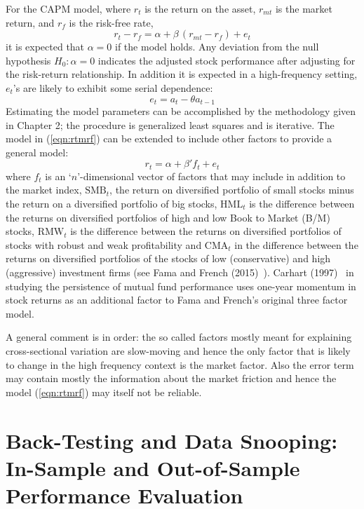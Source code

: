For the CAPM model, where $r_t$ is the return on the asset, $r_{mt}$ is the market return, and $r_f$ is the risk-free rate,
	\begin{equation}\label{eqn:rtmrf}
	r_t - r_f = \alpha + \beta \,( r_{mt} - r_f ) + e_t
	\end{equation}
it is expected that $\alpha=0$ if the model holds. Any deviation from the null hypothesis $H_0:\alpha=0$ indicates the adjusted stock performance after adjusting for the risk-return relationship. In addition it is expected in a high-frequency setting, $e_t$'s are likely to exhibit some serial dependence:
	\begin{equation}\label{eqn:et}
	e_t = a_t - \theta a_{t-1}
	\end{equation}
Estimating the model parameters can be accomplished by the methodology given in Chapter 2; the procedure is generalized least squares and is iterative. The model in (\ref{eqn:rtmrf}) can be extended to include other factors to provide a general model:
	\begin{equation}\label{eqn:rtalpha}
	r_t = \alpha + \beta'f_{t} + e_t
	\end{equation}
where $f_t$ is an `$n$'-dimensional vector of factors that may include in addition to the market index, $\text{SMB}_t$, the return on diversified portfolio of small stocks minus the return on a diversified portfolio of big stocks, $\text{HML}_t$ is the difference between the returns on diversified portfolios of high and low Book to Market (B/M) stocks, $\text{RMW}_t$ is the difference between the returns on diversified portfolios of stocks with robust and weak profitability and $\text{CMA}_t$ in the difference between the returns on diversified portfolios of the stocks of low (conservative) and high (aggressive) investment firms (see Fama and French (2015)~\cite{fama2015}). Carhart (1997)~\cite{carhart1997persistence} in studying the persistence of mutual fund performance uses one-year momentum in stock returns as an additional factor to Fama and French's original three factor model.


A general comment is in order: the so called factors mostly meant for explaining cross-sectional variation are slow-moving and hence the only factor that is likely to change in the high frequency context is the market factor. Also the error term may contain mostly the information about the market friction and hence the model (\ref{eqn:rtmrf}) may itself not be reliable.


\section{Back-Testing and Data Snooping:  In-Sample and Out-of-Sample Performance Evaluation}


